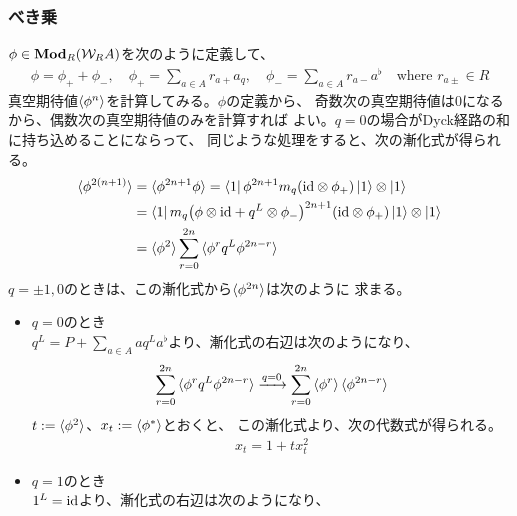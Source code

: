 {\subsubsection{べき乗}\label{s3:べき乗} %
	$\phi\in{\ensuremath{\mathbf{{Mod}}}}_R({{\mathcal{W}}}_RA)$を次のように定義して、
	\begin{equation*}\begin{split}
		\phi = \phi_+ + \phi_-
		,\quad \phi_+ = \sum_{a\in A} r_{a+}a_q
		,\quad \phi_- = \sum_{a\in A} r_{a-}a^\flat
		\quad\text{where } r_{a\pm}\in R
	\end{split}\end{equation*}
	真空期待値$\mathinner{\langle{\phi^n}\rangle}$を計算してみる。$\phi$の定義から、
	奇数次の真空期待値は$0$になるから、偶数次の真空期待値のみを計算すれば
	よい。$q=0$の場合がDyck経路の和に持ち込めることにならって、
	同じような処理をすると、次の漸化式が得られる。
	\begin{equation*}\begin{split}
		\mathinner{\langle{\phi^{2(n+1)}}\rangle} &= \mathinner{\langle{\phi^{2n+1}\phi}\rangle}
		= \mathinner{\langle{1}|}\phi^{2n+1}m_q({\operatorname{id}}\otimes\phi_+)\mathinner{|{1}\rangle}\otimes\mathinner{|{1}\rangle} \\
		&= \mathinner{\langle{1}|}m_q\bigl({\phi\otimes{\ensuremath{\operatorname{id}}} + q^L\otimes\phi_-}\bigr)^{2n+1}
			({\operatorname{id}}\otimes\phi_+)\mathinner{|{1}\rangle}\otimes\mathinner{|{1}\rangle} \\
		&= \mathinner{\langle{\phi^2}\rangle}\sum_{r=0}^{2n}\mathinner{\langle{\phi^rq^L\phi^{2n-r}}\rangle}
	\end{split}\end{equation*}
	$q=\pm1,0$のときは、この漸化式から$\mathinner{\langle{\phi^{2n}}\rangle}$は次のように
	求まる。
	\begin{itemize}\setlength{\itemsep}{-1mm} %
		\item $q=0$のとき \\
		$q^L=P+\sum_{a\in A}aq^La^\flat$より、漸化式の右辺は次のようになり、
		\begin{equation*}\begin{split}
			\sum_{r=0}^{2n}\mathinner{\langle{\phi^rq^L\phi^{2n-r}}\rangle}
			\xrightarrow[{}]{q=0} \sum_{r=0}^{2n}\mathinner{\langle{\phi^r}\rangle}\mathinner{\langle{\phi^{2n-r}}\rangle}
		\end{split}\end{equation*}
		$t:=\mathinner{\langle{\phi^2}\rangle}$、$x_t:=\mathinner{\langle{\phi^*}\rangle}$とおくと、
		この漸化式より、次の代数式が得られる。
		\begin{equation*}\begin{split}
			x_t = 1 + tx_t^2
		\end{split}\end{equation*}
		\item $q=1$のとき \\
		$1^L={\operatorname{id}}$より、漸化式の右辺は次のようになり、

\end{itemize}}
